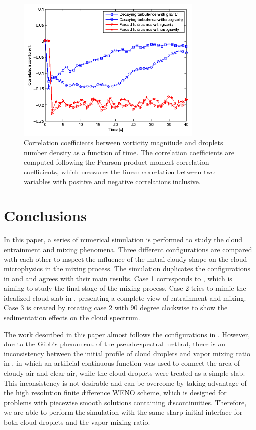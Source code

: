 \documentclass[draft,jgrga]{AGUTeX}
\begin{document}
\begin{article}
\begin{figure}\center
\includegraphics[width=0.8\textwidth]{Figures/correlation}
\caption{Correlation coefficients between vorticity magnitude and droplets number density as a function of time. The correlation coefficients are computed following the Pearson product-moment correlation coefficients, which measures the linear correlation between two variables with positive and negative correlations inclusive.\label{fig:correlation}}
\end{figure}

\section{Conclusions}\label{conclusion}
In this paper, a series of numerical simulation is performed to study the cloud entrainment and mixing phenomena. Three different configurations are compared with each other to inspect the influence of the initial cloudy shape on the cloud microphysics in the mixing process. The simulation duplicates the configurations in \cite{And04} and \cite{Kumar11} and agrees with their main results. Case 1 corresponds to \cite{And04}, which is aiming to study the final stage of the mixing process. Case 2 tries to mimic the idealized cloud slab in \cite{Kumar11}, presenting a complete view of entrainment and mixing. Case 3 is created by rotating case 2 with $90$ degree clockwise to show the sedimentation effects on the cloud spectrum.

The work described in this paper almost follows the configurations in \cite{Kumar11}. However, due to the Gibb's phenomena of the pseudo-spectral method, there is an inconsistency between the initial profile of cloud droplets and vapor mixing ratio in \cite{Kumar11}, in which an artificial continuous function was used to connect the area of cloudy air and clear air, while the cloud droplets were treated as a simple slab. This inconsistency is not desirable and can be overcome by taking advantage of the high resolution finite difference WENO scheme, which is designed for problems with piecewise smooth solutions containing discontinuities. Therefore, we are able to perform the simulation with the same sharp initial interface for both cloud droplets and the vapor mixing ratio.


\end{article}
\end{document}
